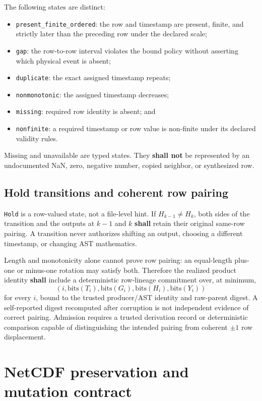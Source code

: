 \documentclass[11pt]{article}
\newcommand{\code}[1]{\texttt{#1}}
\newcommand{\shall}{\textbf{shall}}
\newcommand{\mustnot}{\textbf{shall not}}
\begin{document}
The following states are distinct:
\begin{itemize}
\item \code{present\_finite\_ordered}: the row and timestamp are present,
  finite, and strictly later than the preceding row under the declared scale;
\item \code{gap}: the row-to-row interval violates the bound policy without
  asserting which physical event is absent;
\item \code{duplicate}: the exact assigned timestamp repeats;
\item \code{nonmonotonic}: the assigned timestamp decreases;
\item \code{missing}: required row identity is absent; and
\item \code{nonfinite}: a required timestamp or row value is non-finite under
  its declared validity rules.
\end{itemize}

Missing and unavailable are typed states.  They \mustnot{} be represented by an
undocumented NaN, zero, negative number, copied neighbor, or synthesized row.

\subsection{Hold transitions and coherent row pairing}

\code{Hold} is a row-valued state, not a file-level hint.  If
$H_{k-1}\ne H_k$, both sides of the transition and the outputs at $k-1$ and
$k$ \shall{} retain their original same-row pairing.  A transition never
authorizes shifting an output, choosing a different timestamp, or changing
AST mathematics.

Length and monotonicity alone cannot prove row pairing: an equal-length
plus-one or minus-one rotation may satisfy both.  Therefore the realized
product identity \shall{} include a deterministic row-lineage commitment over,
at minimum,
\[
(i,\mathrm{bits}(T_i),\mathrm{bits}(G_i),
 \mathrm{bits}(H_i),\mathrm{bits}(Y_i))
\]
for every $i$, bound to the trusted producer/AST identity and raw-parent
digest.  A self-reported digest recomputed after corruption is not independent
evidence of correct pairing.  Admission requires a trusted derivation record
or deterministic comparison capable of distinguishing the intended pairing
from coherent $\pm1$ row displacement.

\section{NetCDF preservation and mutation contract}
\end{document}
